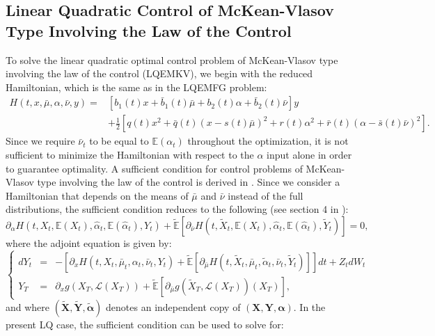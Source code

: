 \documentclass[11pt]{article}
\newcommand\cL{\mathcal L}
\begin{document}
\subsection{\textbf{Linear Quadratic Control of McKean-Vlasov Type Involving the Law of the Control}}\label{sec:EMKV}
To solve the linear quadratic optimal control problem of McKean-Vlasov type involving the law of the control (LQEMKV), we begin with the reduced Hamiltonian, which is the same as in the LQEMFG problem:
\begin{equation*}
\begin{split}
    H(t,x,\bar{\mu},\alpha,\bar{\nu},y)=&\left[b_1(t)x+\bar{b}_1(t)\bar{\mu}+b_2(t) \alpha+\bar{b}_2(t)\bar{\nu}\right]y\\
    &+\frac{1}{2}\left[q(t)x^2+\bar{q}(t)(x-s(t)\bar{\mu})^2 +r(t)\alpha^2+\bar{r}(t)(\alpha-\bar{s}(t)\bar{\nu})^2\right].
\end{split}
\end{equation*}
Since we require $\bar{\nu}_t$ to be equal to $\mathbb{E}(\alpha_t)$ throughout the optimization, it is not sufficient to minimize the Hamiltonian with respect to the $\alpha$ input alone in order to guarantee optimality. A sufficient condition for control problems of McKean-Vlasov type involving the law of the control is derived in \cite{carmona_acciaio}. Since we consider a Hamiltonian that depends on the means of $\bar{\mu}$ and $\bar{\nu}$ instead of the full distributions, the sufficient condition reduces to the following (see section 4 in \cite{carmona_acciaio}):
\begin{equation*}
    \partial_{\alpha}H(t,X_t,\mathbb{E}(X_t),\hat{\alpha}_t,\mathbb{E}(\hat{\alpha}_t),Y_t)+\tilde{\mathbb{E}} \left[\partial_{\bar{\nu}}H(t,\tilde{X}_t,\mathbb{E}(X_t),\hat{\alpha}_t,\mathbb{E}(\hat{\alpha}_t),\tilde{Y}_t) \right]=0,
\end{equation*}
where the adjoint equation is given by:
\begin{equation*}
\left\{
\begin{array}{lcl}
    dY_t&=&-\left[\partial_x H(t,X_t,\bar{\mu}_t,\alpha_t,\bar{\nu}_t,Y_t)+\tilde{\mathbb{E}} \left[\partial_{\bar{\mu}}H(t,\tilde{X}_t,\bar{\mu}_t,\tilde{\alpha}_t,\bar{\nu}_t,\tilde{Y}_t) \right] \right]dt+Z_tdW_t \\[5pt]
    Y_T&=&\partial_xg(X_T, \cL(X_T))+\tilde{\mathbb{E}} \left[\partial_{\bar{\mu}}g(\tilde{X}_T,\cL(X_T))(X_T) \right],
\end{array}
\right.
\end{equation*}
and where $(\boldsymbol{\tilde{X}},\boldsymbol{\tilde{Y}},\boldsymbol{\tilde{\alpha}})$ denotes an independent copy of $(\boldsymbol{X},\boldsymbol{Y},\boldsymbol{\alpha})$. In the present LQ case, the sufficient condition can be used to solve for:
\end{document}

